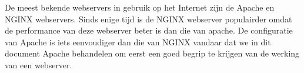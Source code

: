 De meest bekende webservers in gebruik op het Internet zijn de Apache en NGINX webservers. Sinds enige tijd is de NGINX webserver populairder omdat de performance van deze webserver beter is dan die van apache. De configuratie van Apache is iets eenvoudiger dan die van NGINX vandaar dat we in dit document Apache behandelen om eerst een goed begrip te krijgen van de werking van een webserver.

